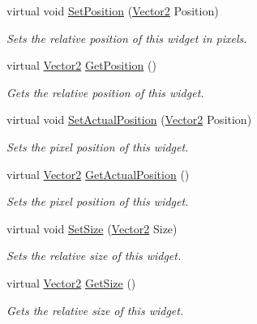 \begin{DoxyCompactItemize}
virtual void \hyperlink{classphys_1_1UI_1_1Scrollbar_a36d82993b031b7be6da66fff8ca2c2d0}{SetPosition} (\hyperlink{classphys_1_1Vector2}{Vector2} Position)
\begin{DoxyCompactList}\small\item\em Sets the relative position of this widget in pixels. \item\end{DoxyCompactList}\item 
virtual \hyperlink{classphys_1_1Vector2}{Vector2} \hyperlink{classphys_1_1UI_1_1Scrollbar_ad049af26ff2247cfcd988cb5639fa003}{GetPosition} ()
\begin{DoxyCompactList}\small\item\em Gets the relative position of this widget. \item\end{DoxyCompactList}\item 
virtual void \hyperlink{classphys_1_1UI_1_1Scrollbar_ad454fa7b60cfc1359961d553389d7b6f}{SetActualPosition} (\hyperlink{classphys_1_1Vector2}{Vector2} Position)
\begin{DoxyCompactList}\small\item\em Sets the pixel position of this widget. \item\end{DoxyCompactList}\item 
virtual \hyperlink{classphys_1_1Vector2}{Vector2} \hyperlink{classphys_1_1UI_1_1Scrollbar_a73337985c0f1f173e253c88705ae5d6e}{GetActualPosition} ()
\begin{DoxyCompactList}\small\item\em Sets the pixel position of this widget. \item\end{DoxyCompactList}\item 
virtual void \hyperlink{classphys_1_1UI_1_1Scrollbar_ae61511d6f1c7afaf27f2551897d3047d}{SetSize} (\hyperlink{classphys_1_1Vector2}{Vector2} Size)
\begin{DoxyCompactList}\small\item\em Sets the relative size of this widget. \item\end{DoxyCompactList}\item 
virtual \hyperlink{classphys_1_1Vector2}{Vector2} \hyperlink{classphys_1_1UI_1_1Scrollbar_aff97ce371ee21fcf3b648dcf8b38e055}{GetSize} ()
\begin{DoxyCompactList}\small\item\em Gets the relative size of this widget. \item\end{DoxyCompactList}\item 

\end{DoxyCompactItemize}
